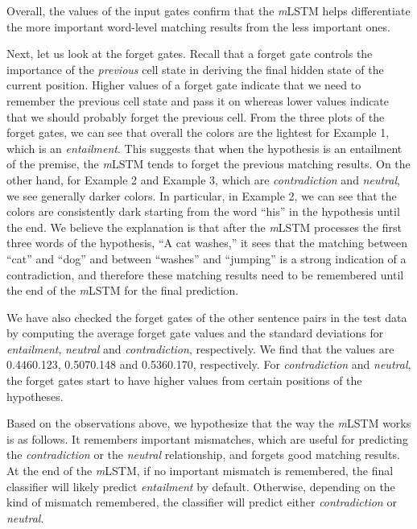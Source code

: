 \documentclass[11pt,letterpaper]{article}
\begin{document}
Overall, the values of the input gates confirm that the \emph{m}LSTM helps differentiate the more important word-level matching results from the less important ones. 

Next, let us look at the forget gates.
Recall that a forget gate controls the importance of the \emph{previous} cell state in deriving the final hidden state of the current position.
Higher values of a forget gate indicate that we need to remember the previous cell state and pass it on whereas lower values indicate that we should probably forget the previous cell.
From the three plots of the forget gates, we can see that overall the colors are the lightest for Example 1, which is an \emph{entailment}.
This suggests that when the hypothesis is an entailment of the premise, the \emph{m}LSTM tends to forget the previous matching results.
On the other hand, for Example 2 and Example 3, which are \emph{contradiction} and \emph{neutral}, we see generally darker colors.
In particular, in Example 2, we can see that the colors are consistently dark starting from the word ``his'' in the hypothesis until the end.
We believe the explanation is that after the \emph{m}LSTM processes the first three words of the hypothesis, ``A cat washes,'' it sees that the matching between ``cat'' and ``dog'' and between ``washes'' and ``jumping'' is a strong indication of a contradiction, and therefore these matching results need to be remembered until the end of the \emph{m}LSTM for the final prediction.

We have also checked the forget gates of the other sentence pairs in the test data by computing the average forget gate values and the standard deviations for \emph{entailment}, \emph{neutral} and \emph{contradiction}, respectively.
We find that the values are 0.4460.123, 0.5070.148 and 0.5360.170, respectively.
For \emph{contradiction} and \emph{neutral}, the forget gates start to have higher values from certain positions of the hypotheses.

Based on the observations above, we hypothesize that the way the \emph{m}LSTM works is as follows. It remembers important mismatches, which are useful for predicting the \emph{contradiction} or the \emph{neutral} relationship, and forgets good matching results.
At the end of the \emph{m}LSTM, if no important mismatch is remembered, the final classifier will likely predict \emph{entailment} by default.
Otherwise, depending on the kind of mismatch remembered, the classifier will predict either \emph{contradiction} or \emph{neutral}.
\end{document}
